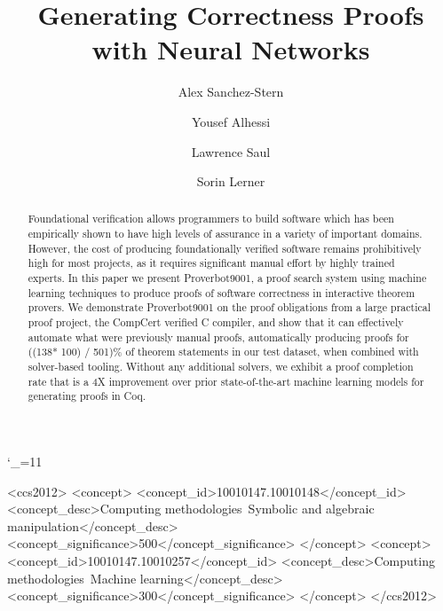 \documentclass[sigplan,screen]{acmart}
\newcommand{\name}{Proverbot9001\xspace}
\newcommand{\PH}{138}
\newcommand{\PHPercent}{\number\numexpr((\PH * 100) / 501)\relax\%\xspace}
\renewcommand{\>}{\quad}
\begin{document}
\sloppy
\catcode`\_=11

\title{Generating Correctness Proofs with Neural Networks}         



\author{Alex Sanchez-Stern}

\author{Yousef Alhessi}

\author{Lawrence Saul}

\author{Sorin Lerner}


\begin{abstract}
Foundational verification allows programmers to build
  software which has been empirically shown to have high levels of assurance
  in a variety of important domains.
However, the cost of producing foundationally verified software
  remains prohibitively high for most projects,
  as it requires significant manual effort by highly trained experts.
In this paper we present \name{},
  a proof search system using machine learning techniques
  to produce proofs of software correctness
  in interactive theorem provers.
We demonstrate \name{} on the proof obligations
  from a large practical proof project,
  the CompCert verified C compiler,
  and show that it can effectively automate
  what were previously manual proofs,
  automatically producing proofs for \PHPercent of theorem statements
  in our test dataset, when combined with solver-based tooling.
Without any additional solvers,
  we exhibit a proof completion rate that is a 4X improvement
  over prior state-of-the-art machine learning models
  for generating proofs in Coq.

\end{abstract}

\begin{CCSXML}
<ccs2012>
 <concept>
  <concept_id>10010147.10010148</concept_id>
  <concept_desc>Computing methodologies~Symbolic and algebraic manipulation</concept_desc>
  <concept_significance>500</concept_significance>
 </concept>
 <concept>
  <concept_id>10010147.10010257</concept_id>
  <concept_desc>Computing methodologies~Machine learning</concept_desc>
  <concept_significance>300</concept_significance>
 </concept>
</ccs2012>
\end{CCSXML}
\end{document}
